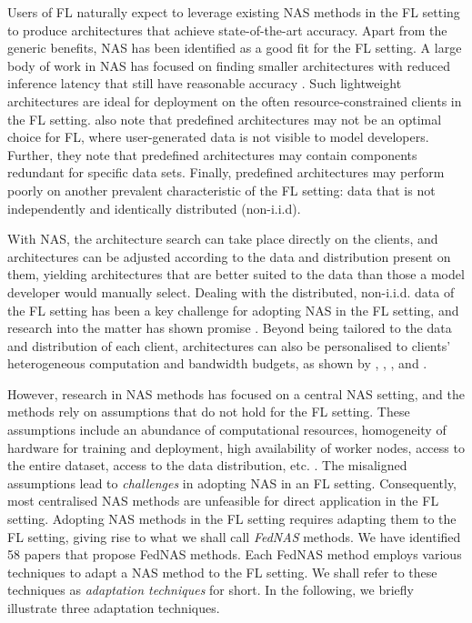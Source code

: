 Users of FL naturally expect to leverage existing NAS methods in the FL setting to produce architectures that achieve state-of-the-art accuracy. Apart from the generic benefits, NAS has been identified as a good fit for the FL setting. A large body of work in NAS has focused on finding smaller architectures with reduced inference latency that still have reasonable accuracy \cite{nas_1000_papers_2023}. Such lightweight architectures are ideal for deployment on the often resource-constrained clients in the FL setting. \cite{fl_advances_and_open_problems_2021} also note that predefined architectures may not be an optimal choice for FL, where user-generated data is not visible to model developers. Further, they note that predefined architectures may contain components redundant for specific data sets. Finally, predefined architectures may perform poorly on another prevalent characteristic of the FL setting: data that is not independently and identically distributed (non-i.i.d). 

With NAS, the architecture search can take place directly on the clients, and architectures can be adjusted according to the data and distribution present on them, yielding architectures that are better suited to the data than those a model developer would manually select. Dealing with the distributed, non-i.i.d. data of the FL setting has been a key challenge for adopting NAS in the FL setting, and research into the matter has shown promise \cite{fednas_2021} \cite{rl_fednas_2021} \cite{fedoras_2022} \cite{finch_2024} \cite{peaches_2024}. Beyond being tailored to the data and distribution of each client, architectures can also be personalised to clients' heterogeneous computation and bandwidth budgets, as shown by \cite{superfednas_2024}, \cite{fedoras_2022}, \cite{perfedrlnas_2024}, and \cite{decnas_2022}.

However, research in NAS methods has focused on a central NAS setting, and the methods rely on assumptions that do not hold for the FL setting. These assumptions include an abundance of computational resources, homogeneity of hardware for training and deployment, high availability of worker nodes, access to the entire dataset, access to the data distribution, etc. \cite{fl_advances_and_open_problems_2021}. The misaligned assumptions lead to \textit{challenges} in adopting NAS in an FL setting. Consequently, most centralised NAS methods are unfeasible for direct application in the FL setting. Adopting NAS methods in the FL setting requires adapting them to the FL setting, giving rise to what we shall call \textit{FedNAS} methods. We have identified 58 papers that propose FedNAS methods. Each FedNAS method employs various techniques to adapt a NAS method to the FL setting. We shall refer to these techniques as \textit{adaptation techniques} for short. In the following, we briefly illustrate three adaptation techniques. 

